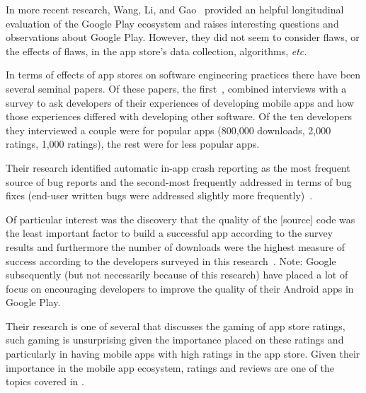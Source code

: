 In more recent research, Wang, Li, and Gao~ provided an helpful longitudinal evaluation of the Google Play ecosystem and raises interesting questions and observations about Google Play. However, they did not seem to consider flaws, or the effects of flaws, in the app store's data collection, algorithms,\emph{ etc.}

In terms of effects of app stores on software engineering practices there have been several seminal papers. %
%
Of these papers, the first~, combined interviews with a survey to ask developers of their experiences of developing mobile apps and how those experiences differed with developing other software. Of the ten developers they interviewed a couple were for popular apps (800,000 downloads, 2,000 ratings, 1,000 ratings), the rest were for less popular apps. %

Their research identified automatic in-app crash reporting as the most frequent source of bug reports and the second-most frequently addressed in terms of bug fixes (end-user written bugs were addressed slightly more frequently)~. 

Of particular interest was the discovery that the quality of the [source] code was the least important factor to build a successful app according to the survey results and furthermore the number of downloads were the highest measure of success according to the developers surveyed in this research~. Note: Google subsequently (but not necessarily because of this research) have placed a lot of focus on encouraging developers to improve the quality of their Android apps in Google Play. 

Their research is one of several that discusses the gaming of app store ratings, such gaming is unsurprising given the importance placed on these ratings and particularly in having mobile apps with high ratings in the app store. Given their importance in the mobile app ecosystem, ratings and reviews are one of the topics covered in .

